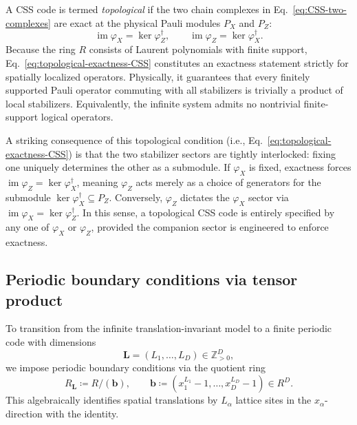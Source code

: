 \documentclass[aps,prx,english,superscriptaddress,twocolumn,tightenlines,showpacs,longbibliography,floatfix,amsfonts]{revtex4-2}
\theoremstyle{remark}
\theoremstyle{definition}
\begin{document}
A CSS code is termed \emph{topological} if the two chain complexes in Eq.~\eqref{eq:CSS-two-complexes} are exact at the physical Pauli modules $P_X$ and $P_Z$:
\begin{equation}
	\operatorname{im}\varphi_X = \ker\varphi_Z^\dagger, \qquad \operatorname{im}\varphi_Z = \ker\varphi_X^\dagger.
	\label{eq:topological-exactness-CSS}
\end{equation}
Because the ring $R$ consists of Laurent polynomials with finite support, Eq.~\eqref{eq:topological-exactness-CSS} constitutes an exactness statement strictly for spatially localized operators. Physically, it guarantees that every finitely supported Pauli operator commuting with all stabilizers is trivially a product of local stabilizers. Equivalently, the infinite system admits no nontrivial finite-support logical operators.

A striking consequence of this topological condition (i.e., Eq.~\eqref{eq:topological-exactness-CSS}) is that the two stabilizer sectors are tightly interlocked: fixing one uniquely determines the other as a submodule. If $\varphi_X$ is fixed, exactness forces $\operatorname{im}\varphi_Z = \ker\varphi_X^\dagger$, meaning $\varphi_Z$ acts merely as a choice of generators for the submodule $\ker\varphi_X^\dagger \subseteq P_Z$. Conversely, $\varphi_Z$ dictates the $\varphi_X$ sector via $\operatorname{im}\varphi_X = \ker\varphi_Z^\dagger$. In this sense, a topological CSS code is entirely specified by any one of $\varphi_X$ or $\varphi_Z$, provided the companion sector is engineered to enforce exactness.

\subsection{Periodic boundary conditions via tensor product}
\label{subsec:periodic-boundary-conditions}

To transition from the infinite translation-invariant model to a finite periodic code with dimensions
\begin{equation}
	\mathbf{L} = (L_1, \dots, L_D) \in \mathbb{Z}_{>0}^D,
\end{equation}
we impose periodic boundary conditions via the quotient ring
\begin{equation}
	R_{\mathbf L} \coloneqq R/(\mathbf{b}),\qquad \mathbf{b}\coloneqq (x_1^{L_1}-1,\dots,x_D^{L_D}-1)\in R^D.
	\label{eq:RL-vector}
\end{equation}
This algebraically identifies spatial translations by $L_\alpha$ lattice sites in the $ x_\alpha $-direction with the identity.
\end{document}
